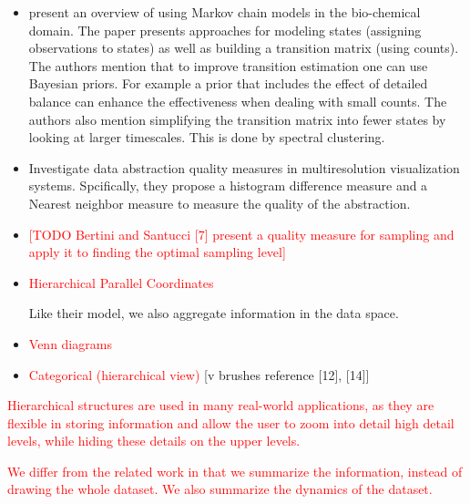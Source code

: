 \begin{itemize}
	
	
	\item \cite{pande-beauchamp-bowman:2010:methods:markov-model-review} present an overview of using Markov chain models in the bio-chemical domain. The paper
	presents approaches for modeling states (assigning observations to states) as well as building a transition
	matrix (using counts). The authors mention that to improve transition estimation one can use Bayesian priors.
	For example a prior that includes the effect of detailed balance can enhance the effectiveness when dealing with
	small counts. The authors also mention simplifying the transition matrix into fewer states by looking at larger
	timescales. This is done by spectral clustering.
	
	\item \cite{4015421} Investigate data abstraction quality measures in multiresolution visualization systems. Spcifically, they propose
	a histogram difference measure and a Nearest neighbor measure to measure the quality of the abstraction.
	
	\item \textcolor{red}{[TODO Bertini and Santucci [7] present a quality measure for sampling and apply it to finding the optimal sampling level]}
	
	\item \textcolor{red}{Hierarchical Parallel Coordinates}
	
	Like their model, we also aggregate information in the data space.
	
	\item \textcolor{red}{Venn diagrams}
	
	\item \textcolor{red}{Categorical (hierarchical view)} [v brushes reference [12], [14]]
\end{itemize}

\textcolor{red}{Hierarchical structures are used in many real-world applications, as they are flexible in storing information
and allow the user to zoom into detail high detail levels, while hiding these details on the upper levels.}

\textcolor{red}{We differ from the related work in that we summarize the information, instead of drawing the whole
dataset. We also summarize the dynamics of the dataset.}